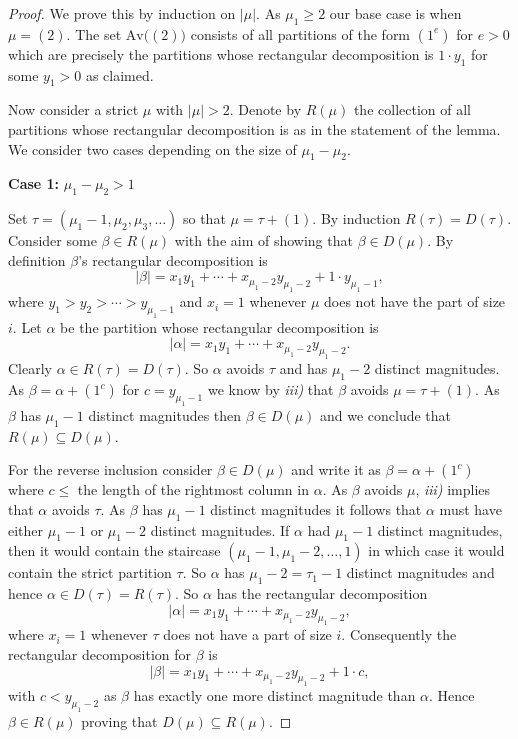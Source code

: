 \documentclass{article}
\theoremstyle{plain}
\theoremstyle{definition}
\newcommand{\Av}{\text{Av}}
\begin{document}
\begin{proof}
	We prove this by induction on $|\mu|$.  As $\mu_1\geq 2$ our base case is when $\mu= (2)$.  The set $\Av\big((2)\big)$ consists of all partitions of the form $(1^e)$ for $e>0$ which are precisely the partitions whose rectangular decomposition is $1\cdot y_1$ for some $y_1>0$ as claimed.
	
Now consider a strict $\mu$ with $|\mu|>2$. Denote by $R(\mu)$ the collection of all partitions whose rectangular decomposition is as in the statement of the lemma.   We consider two cases depending on the size of $\mu_1-\mu_2$. 

\medskip\noindent 
\textbf{Case 1:} $\mu_1-\mu_2>1$
\medskip

Set $\tau = (\mu_1-1, \mu_2,\mu_3,\ldots)$ so that $\mu = \tau +(1)$.  By induction $R(\tau) = D(\tau)$. Consider some $\beta \in R(\mu)$ with the aim of showing that $\beta\in D(\mu)$.  By definition $\beta$'s rectangular decomposition is 
$$|\beta|=x_1y_1 + \cdots + x_{\mu_1-2}y_{\mu_1-2}+ 1\cdot y_{\mu_1-1},$$
where $y_1>y_2>\cdots > y_{\mu_1-1}$ and $x_i=1$ whenever $\mu$ does not have the part of size $i$.  Let $\alpha$ be the partition whose rectangular decomposition is 
$$|\alpha|=x_1y_1 + \cdots + x_{\mu_1-2}y_{\mu_1-2}.$$
Clearly $\alpha \in R(\tau) = D(\tau)$.  So $\alpha$ avoids $\tau$ and has $\mu_1-2$ distinct magnitudes.  As $\beta = \alpha + (1^c)$ for $c = y_{\mu_1-1}$ we know by  \emph{iii)} that $\beta$ avoids $\mu = \tau +(1)$.  As $\beta$ has $\mu_1-1$ distinct magnitudes then $\beta \in D(\mu)$ and we conclude that $R(\mu)\subseteq D(\mu)$.  

For the reverse inclusion consider $\beta\in D(\mu)$ and write it as 
$\beta = \alpha + (1^c)$
where $c\leq$ the length of the rightmost column in $\alpha$.  As $\beta$ avoids $\mu$,  \emph{iii)} implies that $\alpha$ avoids $\tau$.  As $\beta$ has $\mu_1-1$ distinct magnitudes it follows that $\alpha$ must have either $\mu_1-1$ or $\mu_1-2$ distinct magnitudes.  If $\alpha$ had $\mu_1-1$ distinct magnitudes, then it would contain the staircase $(\mu_1-1, \mu_1-2,\ldots, 1)$ in which case it would contain the strict partition $\tau$.  So $\alpha$ has $\mu_1-2 = \tau_1-1$ distinct magnitudes and hence $\alpha \in D(\tau)=R(\tau)$.  
So $\alpha$ has the rectangular decomposition
$$|\alpha| = x_1y_1 + \cdots + x_{\mu_1-2}y_{\mu_1-2},$$
where $x_i = 1$ whenever $\tau$ does not have a part of size $i$.  Consequently the rectangular decomposition for $\beta$ is
$$|\beta| = x_1y_1 + \cdots + x_{\mu_1-2}y_{\mu_1-2}+ 1\cdot c,$$
with $c<y_{\mu_1-2}$ as $\beta$ has exactly one more distinct magnitude than $\alpha$.  Hence $\beta \in R(\mu)$ proving that $D(\mu)\subseteq R(\mu)$.  


\end{proof}
\end{document}
